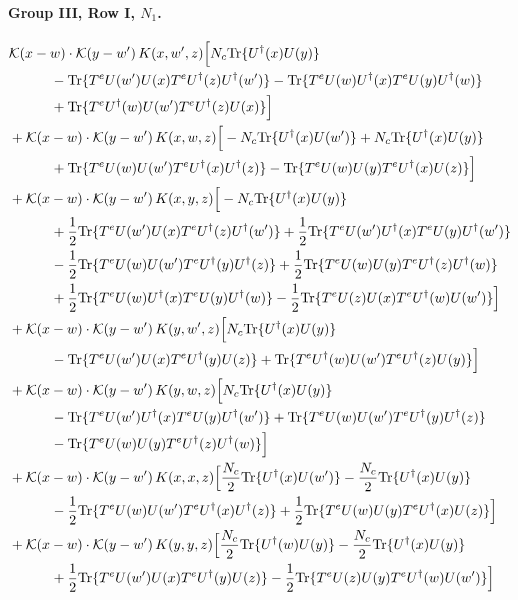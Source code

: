\documentclass[10pt]{article}
\numberwithin{equation}{section}
\begin{document}
\paragraph{Group III, Row I, $N_1$.}

\begin{align}
&\mathcal K(x-w)\cdot\mathcal K(y-w')\,K(x,w',z)\Big[N_c{\rm Tr}\{U^\dagger(x)U(y)\}\notag\\
&\quad\quad\quad-{\rm Tr}\{T^eU(w')U(x)T^eU^\dagger(z)U^\dagger(w')\}-{\rm Tr}\{T^eU(w)U^\dagger(x)T^eU(y)U^\dagger(w)\}\notag\\
&\quad\quad\quad+{\rm Tr}\{T^eU^\dagger(w)U(w')T^eU^\dagger(z)U(x)\}\Big]\notag\\
&+\mathcal K(x-w)\cdot\mathcal K(y-w')\,K(x,w,z)\Big[-N_c{\rm Tr}\{U^\dagger(x)U(w')\}+N_c{\rm Tr}\{U^\dagger(x)U(y)\}\notag\\
&\quad\quad\quad+{\rm Tr}\{T^eU(w)U(w')T^eU^\dagger(x)U^\dagger(z)\}-{\rm Tr}\{T^eU(w)U(y)T^eU^\dagger(x)U(z)\}\Big]\notag\\
&+\mathcal K(x-w)\cdot\mathcal K(y-w')\,K(x,y,z)\Big[-N_c{\rm Tr}\{U^\dagger(x)U(y)\}\notag\\
&\quad\quad\quad+\frac{1}{2}{\rm Tr}\{T^eU(w')U(x)T^eU^\dagger(z)U^\dagger(w')\}+\frac{1}{2}{\rm Tr}\{T^eU(w')U^\dagger(x)T^eU(y)U^\dagger(w')\}\notag\\
&\quad\quad\quad-\frac{1}{2}{\rm Tr}\{T^eU(w)U(w')T^eU^\dagger(y)U^\dagger(z)\}+\frac{1}{2}{\rm Tr}\{T^eU(w)U(y)T^eU^\dagger(z)U^\dagger(w)\}\notag\\
&\quad\quad\quad+\frac{1}{2}{\rm Tr}\{T^eU(w)U^\dagger(x)T^eU(y)U^\dagger(w)\}-\frac{1}{2}{\rm Tr}\{T^eU(z)U(x)T^eU^\dagger(w)U(w')\}\Big]\notag\\
&+\mathcal K(x-w)\cdot\mathcal K(y-w')\,K(y,w',z)\Big[N_c{\rm Tr}\{U^\dagger(x)U(y)\}\notag\\
&\quad\quad\quad-{\rm Tr}\{T^eU(w')U(x)T^eU^\dagger(y)U(z)\}+{\rm Tr}\{T^eU^\dagger(w)U(w')T^eU^\dagger(z)U(y)\}\Big]\notag\\
&+\mathcal K(x-w)\cdot\mathcal K(y-w')\,K(y,w,z)\Big[N_c{\rm Tr}\{U^\dagger(x)U(y)\}\notag\\
&\quad\quad\quad-{\rm Tr}\{T^eU(w')U^\dagger(x)T^eU(y)U^\dagger(w')\}+{\rm Tr}\{T^eU(w)U(w')T^eU^\dagger(y)U^\dagger(z)\}\notag\\
&\quad\quad\quad-{\rm Tr}\{T^eU(w)U(y)T^eU^\dagger(z)U^\dagger(w)\}\Big]\notag\\
&+\mathcal K(x-w)\cdot\mathcal K(y-w')\,K(x,x,z)\Big[\frac{N_c}{2}{\rm Tr}\{U^\dagger(x)U(w')\}-\frac{N_c}{2}{\rm Tr}\{U^\dagger(x)U(y)\}\notag\\
&\quad\quad\quad-\frac{1}{2}{\rm Tr}\{T^eU(w)U(w')T^eU^\dagger(x)U^\dagger(z)\}+\frac{1}{2}{\rm Tr}\{T^eU(w)U(y)T^eU^\dagger(x)U(z)\}\Big]\notag\\
&+\mathcal K(x-w)\cdot\mathcal K(y-w')\,K(y,y,z)\Big[\frac{N_c}{2}{\rm Tr}\{U^\dagger(w)U(y)\}-\frac{N_c}{2}{\rm Tr}\{U^\dagger(x)U(y)\}\notag\\
&\quad\quad\quad+\frac{1}{2}{\rm Tr}\{T^eU(w')U(x)T^eU^\dagger(y)U(z)\}-\frac{1}{2}{\rm Tr}\{T^eU(z)U(y)T^eU^\dagger(w)U(w')\}\Big]
\label{eq:list14}
\end{align}
\end{document}

